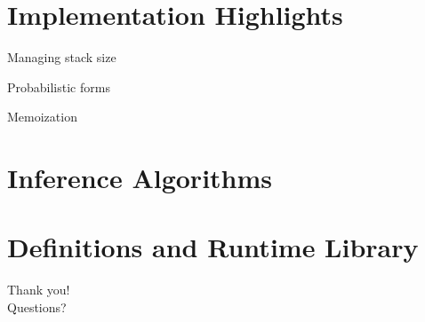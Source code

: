 \documentclass{beamer}
\begin{document}
\section{Implementation Highlights}

\begin{frame}{Managing stack size}
\end{frame}

\begin{frame}{Probabilistic forms}
\end{frame}

\begin{frame}{Memoization}
\end{frame}

\section{Inference Algorithms}

\section{Definitions and Runtime Library}

\begin{frame}
    \LARGE
    \center
    Thank you!\\Questions?
\end{frame}
\end{document}
